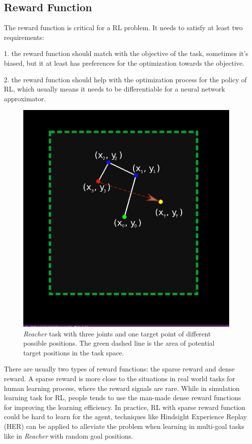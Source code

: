 \documentclass{article}
\begin{document}
\subsection{Reward Function}
The reward function is critical for a RL problem. It needs to satisfy at least two requirements: 

1. the reward function should match with the objective of the task, sometimes it's biased, but it at least has preferences for the optimization towards the objective.

2. the reward function should help with the optimization process for the policy of RL, which usually means it needs to be differentiable for a neural network approximator. 
\begin{figure}[htbp]
	\centering
	\includegraphics[scale=0.3]{img/reacher1.png}
	\caption{\textit{Reacher} task with three joints and one target point of different possible positions. The green dashed line is the area of potential target positions in the task space.}
	\label{fig:universe}
\end{figure}

There are usually two types of reward functions: the sparse reward and dense reward. A sparse reward is more close to the situations in real world tasks for human learning process, where the reward signals are rare. While in simulation learning task for RL, people tends to use the man-made dense reward functions for improving the learning efficiency. In practice, RL with sparse reward function could be hard to learn for the agent, techniques like Hindsight Experience Replay (HER) \cite{andrychowicz2017hindsight} can be applied to alleviate the problem when learning in multi-goal tasks like in \textit{Reacher} with random goal positions. 
\end{document}

